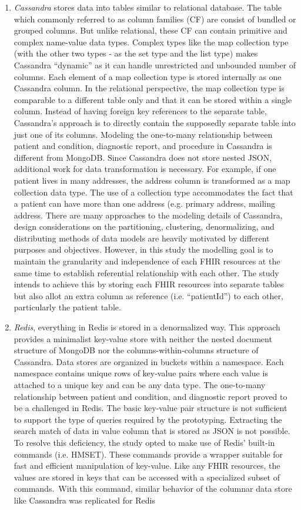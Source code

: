\documentclass[5p]{elsarticle}
\begin{document}
\begin{enumerate}
\item \emph{Cassandra} stores data into tables similar to relational database. The table which commonly referred to as column families (CF) are consist of bundled or grouped columns. But unlike relational, these CF can contain primitive and complex name-value data types. Complex types like the map collection type (with the other two types - as the set type and the list type) makes Cassandra “dynamic” as it can handle unrestricted and unbounded number of columns. Each element of a map collection type is stored internally as one Cassandra column. In the relational perspective, the map collection type is comparable to a different table only and that it can be stored within a single column. Instead of having foreign key references to the separate table, Cassandra’s approach is to directly contain the supposedly separate table into just one of its columns. 
Modeling the one-to-many relationship between patient and condition, diagnostic report, and procedure in Cassandra is different from MongoDB. Since Cassandra does not store nested JSON, additional work for data transformation is necessary. For example, if one patient lives in many addresses, the address column is transformed as a map collection data type. The use of a collection type accommodates the fact that a patient can have more than one address (e.g. primary address, mailing address. 
There are many approaches to the modeling details of Cassandra, design considerations on the partitioning, clustering, denormalizing, and distributing methods of data models are heavily motivated by different purposes and objectives. However, in this study the modelling goal is to maintain the granularity and independence of each FHIR resources at the same time to establish referential relationship with each other. The study intends to achieve this by storing each FHIR resources into separate tables but also allot an extra column as reference (i.e. “patientId”) to each other, particularly the patient table.
\\
\item \emph{Redis}, everything in Redis is stored in a denormalized way. This approach provides a minimalist key-value store with neither the nested document structure of MongoDB nor the columns-within-columns structure of Cassandra. Data stores are organized in buckets within a namespace. Each namespace contains unique rows of key-value pairs where each value is attached to a unique key and can be any data type.
The one-to-many relationship between patient and condition, and diagnostic report proved to be a challenged in Redis. The basic key-value pair structure is not sufficient to support the type of queries required by the prototyping. Extracting the search match of data in value column that is stored as JSON is not possible. To resolve this deficiency, the study opted to make use of Redis’ built-in commands (i.e. HMSET). These commands provide a wrapper suitable for fast and efficient manipulation of key-value. Like any FHIR resources, the values are stored in keys that can be accessed with a specialized subset of commands. With this command, similar behavior of the columnar data store like Cassandra was replicated for Redis



\end{enumerate}
\end{document}
